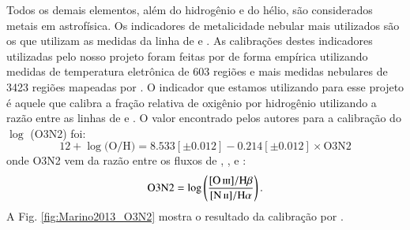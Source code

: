 Todos os demais elementos, além do hidrogênio e do hélio, são considerados metais em astrofísica.
Os indicadores de metalicidade nebular mais utilizados são os que utilizam as medidas da
linha de \OIII e \NII. As calibrações destes indicadores utilizadas pelo nosso projeto foram feitas por
\citet{Marino.etal.2013a} de forma empírica utilizando medidas de temperatura eletrônica de 603
regiões \Hii e mais medidas nebulares de 3423 regiões \Hii mapeadas por \citet{Sanchez.etal.2013a}.
O indicador que estamos utilizando para esse projeto é aquele que calibra a fração relativa de
oxigênio por hidrogênio utilizando a razão entre as linhas de \oIII e \nII. O valor encontrado pelos
autores para a calibração do $\log$ (O3N2) foi:
\begin{equation}
	12 + \log \textrm{(O/H)} = 8.533[\pm0.012] - 0.214[\pm0.012]\times \textrm{O3N2}
\end{equation}
\noindent onde O3N2 vem da razão entre os fluxos de \oIII, \Hbeta, \nII e \Halpha: 
\begin{equation}
	\textrm{O3N2} = \log \left(\frac{\oIII/\Hbeta}{\nII/\Halpha}\right). 
\end{equation}
A Fig. \ref{fig:Marino2013_O3N2} mostra o resultado da calibração por \citet{Marino.etal.2013a}.

